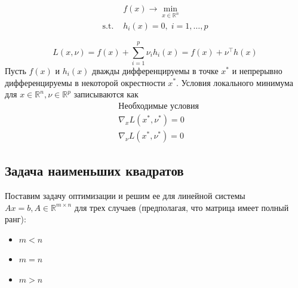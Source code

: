 \documentclass[
  russian,
  letterpaper,
  DIV=11,
  numbers=noendperiod]{scrartcl}
\providecommand{\tightlist}{%
  \setlength{\itemsep}{0pt}\setlength{\parskip}{0pt}}
\begin{document}
\[
\tag{ECP}
\begin{split}
& f(x) \to \min\limits_{x \in \mathbb{R}^n} \\
\text{s.t. } & h_i(x) = 0, \; i = 1,\ldots, p
\end{split}
\]

\[
L(x, \nu) = f(x) + \sum\limits_{i=1}^p\nu_i h_i(x) = f(x) + \nu^\top h(x)
\] Пусть \(f(x)\) и \(h_i(x)\) дважды дифференцируемы в точке \(x^*\) и
непрерывно дифференцируемы в некоторой окрестности \(x^*\). Условия
локального минимума для \(x \in \mathbb{R}^n, \nu \in \mathbb{R}^p\)
записываются как \[
\begin{split}
& \text{Необходимые условия} \\
& \nabla_x L(x^*, \nu^*) = 0 \\
& \nabla_\nu L(x^*, \nu^*) = 0
\end{split}
\]

\subsection{Задача наименьших
квадратов}\label{ux437ux430ux434ux430ux447ux430-ux43dux430ux438ux43cux435ux43dux44cux448ux438ux445-ux43aux432ux430ux434ux440ux430ux442ux43eux432}

\begin{tcolorbox}[enhanced jigsaw, opacityback=0, opacitybacktitle=0.6, toptitle=1mm, leftrule=.75mm, bottomrule=.15mm, colbacktitle=quarto-callout-color!10!white, breakable, title=\textcolor{quarto-callout-color}{\faInfo}\hspace{0.5em}{Example}, left=2mm, bottomtitle=1mm, colback=white, titlerule=0mm, arc=.35mm, rightrule=.15mm, toprule=.15mm, coltitle=black, colframe=quarto-callout-color-frame]

Поставим задачу оптимизации и решим ее для линейной системы
\(Ax = b, A \in \mathbb{R}^{m \times n}\) для трех случаев (предполагая,
что матрица имеет полный ранг):

\begin{itemize}
\tightlist
\item
  \(m < n\)
\item
  \(m = n\)
\item
  \(m > n\)
\end{itemize}

\end{tcolorbox}
\end{document}
